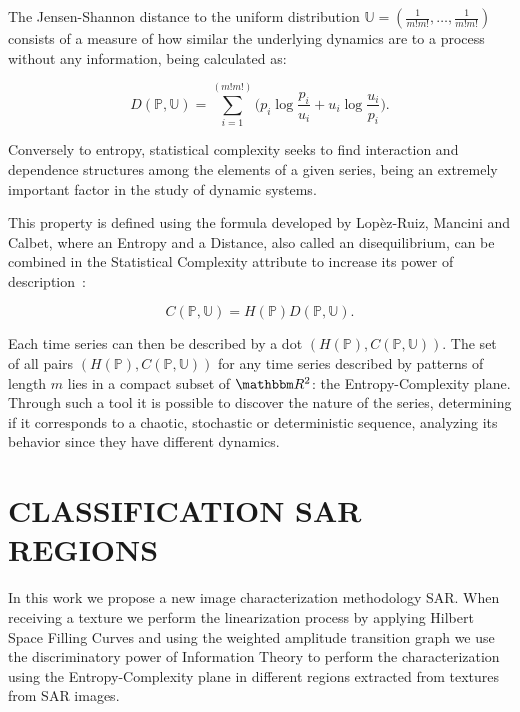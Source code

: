 \documentclass{isprs}
\begin{document}
	The Jensen-Shannon distance to the uniform distribution $\mathbb{U} = (\frac{1}{m!m!}, \dots, \frac{1}{m!m!})$ consists of a measure of how similar the underlying dynamics are to a process without any information, being calculated as:
	
	\begin{equation}
	D(\mathbb{P}, \mathbb{U}) = \sum_{i=1}^{(m!m!)} \Big(p_i \log\frac{p_i}{u_i} +
	u_i \log\frac{u_i}{p_i}
	\Big).
	\end{equation}
	
	Conversely to entropy, statistical complexity seeks to find interaction and dependence structures among the elements of a given series, being an extremely important factor in the study of dynamic systems.
	
	This property is defined using the formula developed by Lopèz-Ruiz, Mancini and Calbet, where an Entropy and a Distance, also called an disequilibrium, can be combined in the Statistical Complexity attribute to increase its power of description~\citep{Feldman2008information,Feldman1998Statistical,Lopez1995statistical}:
	
	\begin{equation}
	C(\mathbb{P}, \mathbb{U}) = H(\mathbb{P}) D(\mathbb{P}, \mathbb{U}).
	\end{equation}
	
	Each time series can then be described by a dot $(H(\mathbb{P}), C(\mathbb{P}, \mathbb{U}))$.
	The set of all pairs $(H(\mathbb{P}), C(\mathbb{P}, \mathbb{U}))$ for any time series described by patterns of length $m$ lies in a compact subset of $\mathbbm R^2$: the Entropy-Complexity plane. 
	Through such a tool it is possible to discover the nature of the series, determining if it corresponds to a chaotic, stochastic or deterministic sequence, analyzing its behavior since they have different dynamics.
	
	\section{CLASSIFICATION SAR REGIONS}\label{SAR}
	
	In this work we propose a new image characterization methodology SAR.
	When receiving a texture we perform the linearization process by applying Hilbert Space Filling Curves and using the weighted amplitude transition graph we use the discriminatory power of Information Theory to perform the characterization using the Entropy-Complexity plane in different regions extracted from textures from SAR images.
	
\end{document}
